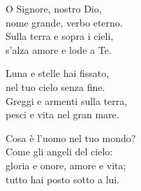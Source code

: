 
\strofa O Signore, nostro Dio,\\
nome grande, verbo eterno.\\
Sulla terra e sopra i cieli,\\
s'alza amore e lode a Te.

\spazio

\strofa Luna e stelle hai fissato,\\
nel tuo cielo senza fine.\\
Greggi e armenti sulla terra,\\
pesci e vita nel gran mare.

\spazio

\strofa Cosa è l'uomo nel tuo mondo?\\
Come gli angeli del cielo:\\
gloria e onore, amore e vita;\\
tutto hai posto sotto a lui.